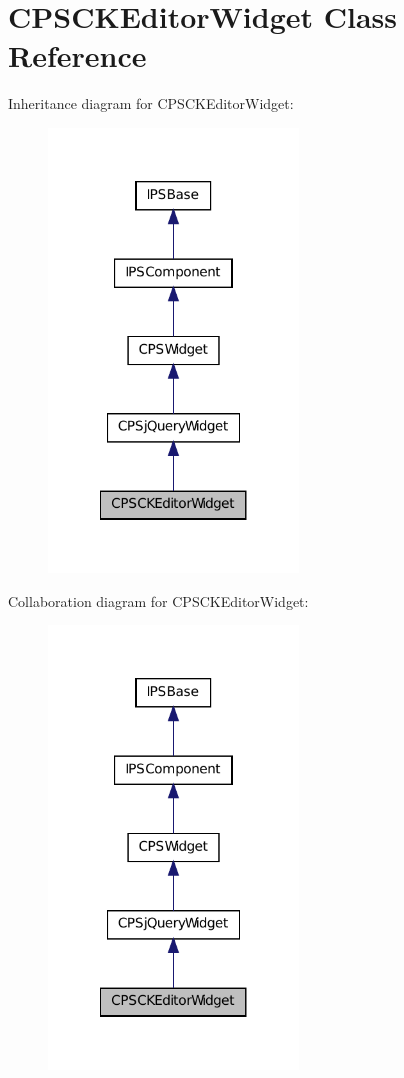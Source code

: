 \hypertarget{classCPSCKEditorWidget}{
\section{CPSCKEditorWidget Class Reference}
\label{classCPSCKEditorWidget}
}


Inheritance diagram for CPSCKEditorWidget:\nopagebreak
\begin{figure}[H]
\begin{center}
\leavevmode
\includegraphics[width=188pt]{classCPSCKEditorWidget__inherit__graph}
\end{center}
\end{figure}


Collaboration diagram for CPSCKEditorWidget:\nopagebreak
\begin{figure}[H]
\begin{center}
\leavevmode
\includegraphics[width=188pt]{classCPSCKEditorWidget__coll__graph}
\end{center}
\end{figure}
